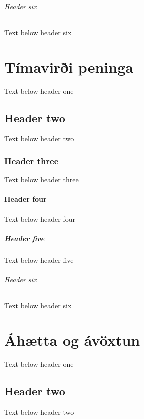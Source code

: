 \documentclass[a4paper,10pt,icelandic]{sphinxmanual}
\begin{document}
\subparagraph{Header six}
\label{\detokenize{vextir/index:header-six}}
\sphinxAtStartPar
Text below header six

\sphinxstepscope


\chapter{Tímavirði peninga}
\label{\detokenize{timavirdi-peninga/index:timaviri-peninga}}\label{\detokenize{timavirdi-peninga/index::doc}}
\sphinxAtStartPar
Text below header one


\section{Header two}
\label{\detokenize{timavirdi-peninga/index:header-two}}
\sphinxAtStartPar
Text below header two


\subsection{Header three}
\label{\detokenize{timavirdi-peninga/index:header-three}}
\sphinxAtStartPar
Text below header three


\subsubsection{Header four}
\label{\detokenize{timavirdi-peninga/index:header-four}}
\sphinxAtStartPar
Text below header four


\paragraph{Header five}
\label{\detokenize{timavirdi-peninga/index:header-five}}
\sphinxAtStartPar
Text below header five


\subparagraph{Header six}
\label{\detokenize{timavirdi-peninga/index:header-six}}
\sphinxAtStartPar
Text below header six

\sphinxstepscope


\chapter{Áhætta og ávöxtun}
\label{\detokenize{ahaetta-og-avoxtun/index:ahaetta-og-avoxtun}}\label{\detokenize{ahaetta-og-avoxtun/index::doc}}
\sphinxAtStartPar
Text below header one


\section{Header two}
\label{\detokenize{ahaetta-og-avoxtun/index:header-two}}
\sphinxAtStartPar
Text below header two
\end{document}
